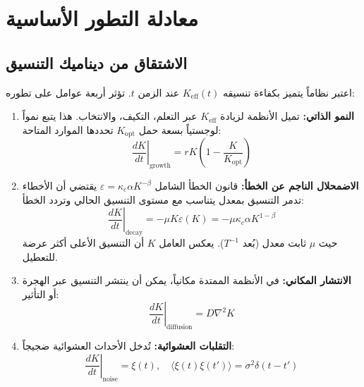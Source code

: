 \documentclass[11pt,a4paper]{article}
\newcommand{\Keff}{K_{\mathrm{eff}}}
\newcommand{\Keffopt}{K_{\mathrm{opt}}}
\newcommand{\kappac}{\kappa_c}
\newcommand{\eps}{\varepsilon}
\begin{document}
	\section{معادلة التطور الأساسية}
	\label{sec:evolution-eq}
	
	\subsection{الاشتقاق من ديناميك التنسيق}
	
	اعتبر نظاماً يتميز بكفاءة تنسيقه \(\Keff(t)\) عند الزمن \(t\). تؤثر أربعة عوامل على تطوره:
	
	\begin{enumerate}
		\item \textbf{النمو الذاتي:} تميل الأنظمة لزيادة \(\Keff\) عبر التعلم، التكيف، والانتخاب. هذا يتبع نمواً لوجستياً بسعة حمل \(\Keffopt\) تحددها الموارد المتاحة:
		\begin{equation}
			\left.\frac{dK}{dt}\right|_{\text{growth}} = r K \left(1 - \frac{K}{\Keffopt}\right)
			\label{eq:growth}
		\end{equation}
		
		\item \textbf{الاضمحلال الناجم عن الخطأ:} قانون الخطأ الشامل \(\eps = \kappac \alpha K^{-\beta}\) يقتضي أن الأخطاء تدمر التنسيق بمعدل يتناسب مع مستوى التنسيق الحالي وتردد الخطأ:
		\begin{equation}
			\left.\frac{dK}{dt}\right|_{\text{decay}} = -\mu K \eps(K) = -\mu \kappac \alpha K^{1-\beta}
			\label{eq:decay}
		\end{equation}
		حيث \(\mu\) ثابت معدل (بُعد \(T^{-1}\)). يعكس العامل \(K\) أن التنسيق الأعلى أكثر عرضة للتعطيل.
		
		\item \textbf{الانتشار المكاني:} في الأنظمة الممتدة مكانياً، يمكن أن ينتشر التنسيق عبر الهجرة أو التأثير:
		\begin{equation}
			\left.\frac{dK}{dt}\right|_{\text{diffusion}} = D \nabla^2 K
			\label{eq:diffusion}
		\end{equation}
		
		\item \textbf{التقلبات العشوائية:} تُدخل الأحداث العشوائية ضجيجاً:
		\begin{equation}
			\left.\frac{dK}{dt}\right|_{\text{noise}} = \xi(t), \quad \langle \xi(t)\xi(t')\rangle = \sigma^2 \delta(t-t')
			\label{eq:noise}
		\end{equation}
	\end{enumerate}
	
\end{document}
